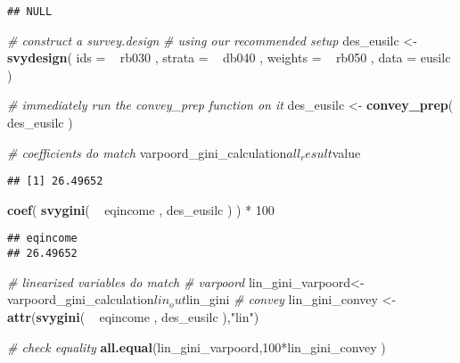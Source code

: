 \documentclass[]{book}
\newenvironment{Shaded}{\begin{snugshade}}{\end{snugshade}}
\newcommand{\KeywordTok}[1]{\textcolor[rgb]{0.13,0.29,0.53}{\textbf{{#1}}}}
\newcommand{\DataTypeTok}[1]{\textcolor[rgb]{0.13,0.29,0.53}{{#1}}}
\newcommand{\DecValTok}[1]{\textcolor[rgb]{0.00,0.00,0.81}{{#1}}}
\newcommand{\StringTok}[1]{\textcolor[rgb]{0.31,0.60,0.02}{{#1}}}
\newcommand{\CommentTok}[1]{\textcolor[rgb]{0.56,0.35,0.01}{\textit{{#1}}}}
\newcommand{\NormalTok}[1]{{#1}}
\theoremstyle{definition}
\theoremstyle{definition}
\theoremstyle{remark}
\begin{document}
\begin{verbatim}
## NULL
\end{verbatim}

\begin{Shaded}
\begin{Highlighting}[]
\CommentTok{# construct a survey.design}
\CommentTok{# using our recommended setup}
\NormalTok{des_eusilc <-}\StringTok{ }
\StringTok{    }\KeywordTok{svydesign}\NormalTok{( }
        \DataTypeTok{ids =} \NormalTok{~}\StringTok{ }\NormalTok{rb030 , }
        \DataTypeTok{strata =} \NormalTok{~}\StringTok{ }\NormalTok{db040 ,  }
        \DataTypeTok{weights =} \NormalTok{~}\StringTok{ }\NormalTok{rb050 , }
        \DataTypeTok{data =} \NormalTok{eusilc}
    \NormalTok{)}

\CommentTok{# immediately run the convey_prep function on it}
\NormalTok{des_eusilc <-}\StringTok{ }\KeywordTok{convey_prep}\NormalTok{( des_eusilc )}

\CommentTok{# coefficients do match}
\NormalTok{varpoord_gini_calculation$all_result$value}
\end{Highlighting}
\end{Shaded}

\begin{verbatim}
## [1] 26.49652
\end{verbatim}

\begin{Shaded}
\begin{Highlighting}[]
\KeywordTok{coef}\NormalTok{( }\KeywordTok{svygini}\NormalTok{( ~}\StringTok{ }\NormalTok{eqincome , des_eusilc ) ) *}\StringTok{ }\DecValTok{100}
\end{Highlighting}
\end{Shaded}

\begin{verbatim}
## eqincome 
## 26.49652
\end{verbatim}

\begin{Shaded}
\begin{Highlighting}[]
\CommentTok{# linearized variables do match}
\CommentTok{# varpoord}
\NormalTok{lin_gini_varpoord<-}\StringTok{ }\NormalTok{varpoord_gini_calculation$lin_out$lin_gini}
\CommentTok{# convey }
\NormalTok{lin_gini_convey <-}\StringTok{ }\KeywordTok{attr}\NormalTok{(}\KeywordTok{svygini}\NormalTok{( ~}\StringTok{ }\NormalTok{eqincome , des_eusilc ),}\StringTok{"lin"}\NormalTok{)}

\CommentTok{# check equality}
\KeywordTok{all.equal}\NormalTok{(lin_gini_varpoord,}\DecValTok{100}\NormalTok{*lin_gini_convey )}
\end{Highlighting}
\end{Shaded}
\end{document}
